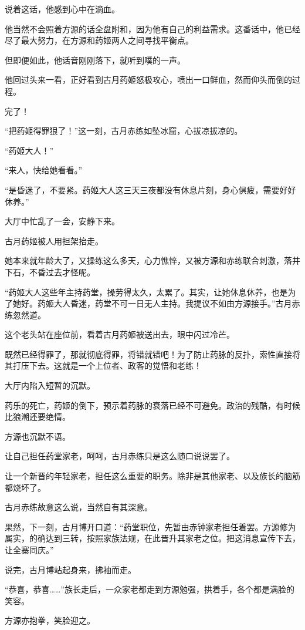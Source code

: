 \begin{this_body}
说着这话，他感到心中在滴血。

他当然不会照着方源的话全盘附和，因为他有自己的利益需求。这番话中，他已经尽了最大努力，在方源和药姬两人之间寻找平衡点。

但即便如此，他话音刚刚落下，就听到噗的一声。

他回过头来一看，正好看到古月药姬怒极攻心，喷出一口鲜血，然而仰头而倒的过程。

完了！

“把药姬得罪狠了！”这一刻，古月赤练如坠冰窟，心拔凉拔凉的。

“药姬大人！”

“来人，快给她看看。”

“是昏迷了，不要紧。药姬大人这三天三夜都没有休息片刻，身心俱疲，需要好好休养。”

大厅中忙乱了一会，安静下来。

古月药姬被人用担架抬走。

她本来就年龄大了，又操练这么多天，心力憔悴，又被方源和赤练联合刺激，落井下石，不昏过去才怪呢。

“药姬大人这些年主持药堂，操劳得太久，太累了。其实，让她休息休养，也是为了她好。药姬大人昏迷，药堂不可一日无人主持。我提议不如由方源接手。”古月赤练忽然道。

这个老头站在座位前，看着古月药姬被送出去，眼中闪过冷芒。

既然已经得罪了，那就彻底得罪，将错就错吧！为了防止药脉的反扑，索性直接将其打压下去。这就是一个上位者、政客的觉悟和老练！

大厅内陷入短暂的沉默。

药乐的死亡，药姬的倒下，预示着药脉的衰落已经不可避免。政治的残酷，有时候比狼潮还要绝情。

方源也沉默不语。

让自己担任药堂家老，呵呵，古月赤练只是这么随口说说罢了。

让一个新晋的年轻家老，担任这么重要的职务。除非是其他家老、以及族长的脑筋都烧坏了。

古月赤练故意这么说，当然自有其深意。

果然，下一刻，古月博开口道：“药堂职位，先暂由赤钟家老担任着罢。方源修为属实，的确达到三转，按照家族法规，在此晋升其家老之位。把这消息宣传下去，让全寨同庆。”

说完，古月博站起身来，拂袖而走。

“恭喜，恭喜……”族长走后，一众家老都走到方源勉强，拱着手，各个都是满脸的笑容。

方源亦抱拳，笑脸迎之。

\end{this_body}

